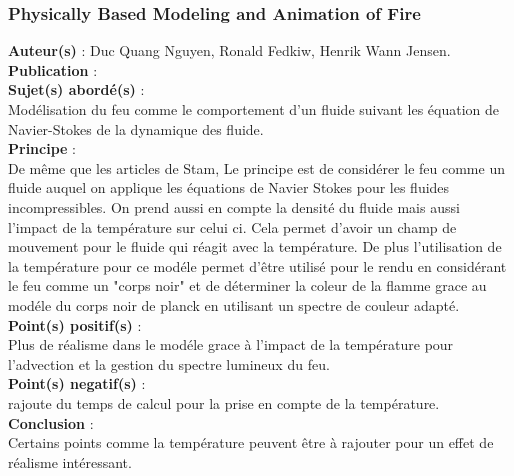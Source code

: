 \documentclass[a4paper,10pt]{article}
\begin{document}
\subsubsection{Physically Based Modeling and Animation of Fire}
\textbf{Auteur(s)} : Duc Quang Nguyen, Ronald Fedkiw, Henrik Wann Jensen.\\
\textbf{Publication} :  \\
\textbf{Sujet(s) abordé(s)} : \\ 
	Modélisation du feu comme le comportement d'un fluide suivant les équation de Navier-Stokes de la dynamique des fluide.\\
\textbf{Principe} :\\	
	De même que les articles de Stam, Le principe est de considérer le feu comme un fluide auquel on applique les équations de Navier Stokes  pour les fluides incompressibles. On prend aussi en compte la densité du fluide mais aussi l'impact de la température sur celui ci. Cela permet d'avoir un champ de mouvement pour le fluide qui réagit avec la température. De plus l'utilisation de la température pour ce modéle permet d'être utilisé pour le rendu en considérant le feu comme un "corps noir" et de déterminer la coleur de la flamme grace au modéle du corps noir de planck en utilisant un spectre de couleur adapté.\\
\textbf{Point(s) positif(s)} :\\
	Plus de réalisme dans le modéle grace à l'impact de la température pour l'advection et la gestion du spectre lumineux du feu.\\	
\textbf{Point(s) negatif(s)} :\\
	rajoute du temps de calcul pour la prise en compte de la température.\\
\textbf{Conclusion} :\\
	Certains points comme la température peuvent être à rajouter pour un effet de réalisme intéressant.\\
\end{document}
